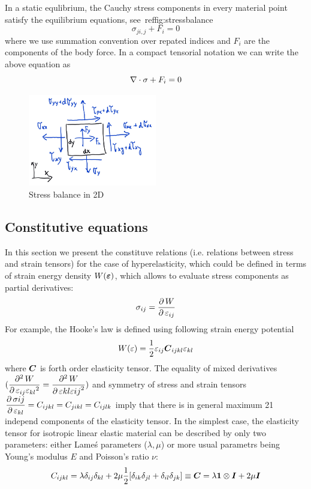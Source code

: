 \documentclass[11pt]{article}
\begin{document}
In a static equlibrium, the Cauchy stress components in every material point satisfy the equilibrium equations, see~ref{fig:stressbalance}
\begin{equation}
  \sigma_{ji, j} + F_i = 0
\end{equation}
where we use summation convention over repated indices and $F_i$ are the components of the body force. In a compact tensorial notation we can write the above equation as
\begin{equation}
  \nabla\cdot\sigma + F_i = 0
  \label{eq:staticequlibrium3d}
\end{equation}

\begin{figure}
  \begin{center}
    \includegraphics[width=0.5\textwidth]{stressbalance2d.png}
  \end{center}
  \label{fig:stressbalance}
  \caption{Stress balance in 2D}
\end{figure}

\subsection{Constitutive equations}
In this section we present the constituve relations (i.e. relations between stress and strain tensors) for the case of hyperelasticity, which could be defined in terms of strain energy density $W(\mbox{\boldmath$\varepsilon$})$, which allows to evaluate stress components as partial derivatives:
$$
\sigma_{ij}=\mbox{$\displaystyle\frac{\partial \,{W}}{\partial \,{\varepsilon_{ij}}}$}
$$
For example, the Hooke's law  is defined using following strain energy potential
$$
W(\varepsilon) = \mbox{$\displaystyle\frac{1}{2}$}\varepsilon_{ij}\mbox{\boldmath$C$}_{ijkl}\varepsilon_{kl}
$$
where $\mbox{\boldmath$C$}$ is forth order elasticity tensor. The equality of mixed derivatives $(\mbox{$\displaystyle\frac{\partial ^{2}\,{W}}{\partial \,{\varepsilon_{ij}\varepsilon_{kl}}^{2}}$} = \mbox{$\displaystyle\frac{\partial ^{2}\,{W}}{\partial \,{\varepsilon{kl}\varepsilon{ij}}^{2}}$})$ and symmetry of stress and strain tensors $\mbox{$\displaystyle\frac{\partial \,{\sigma{ij}}}{\partial \,{\varepsilon_{kl}}}$} = C_{ijkl}=C_{jikl}=C_{ijlk}$ imply that there is in general maximum 21 independ components of the elasticity tensor.
In the simplest case, the elasticity tensor for isotropic linear elastic material  can be described by only two parameters: either Lame\'s parameters ($\lambda, \mu$) or more usual parametrs being Young's modulus $E$ and Poisson's ratio $\nu$:
$$
C_{ijkl}=\lambda\delta_{ij}\delta_{kl}+2\mu {1\over 2}[\delta_{ik}\delta_{jl}+
 \delta_{il}\delta_{jk}] \equiv \mbox{\boldmath$C$}=\lambda\mbox{\boldmath$1$}\otimes\mbox{\boldmath$I$}+2\mu\mbox{\boldmath$I$}
$$
\end{document}
